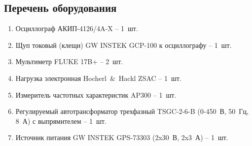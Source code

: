 \subsection{Перечень оборудования}

\begin{enumerate}
    \item Осциллограф АКИП-4126/4A-X -- 1~шт.
    \item Щуп токовый (клещи) GW INSTEK GCP-100 к осциллографу -- 1~шт.
    \item Мультиметр FLUKE 17B+ -- 2~шт.
    \item Нагрузка электронная Hocherl~\&~Hackl ZSAC -- 1~шт.
    \item Измеритель частотных характеристик AP300 -- 1~шт.
    \item Регулируемый автотрансформатор трехфазный TSGC-2-6-B (0-450~В, 50~Гц, 8~А) с выпрямителем -- 1~шт.
    \item Источник питания GW INSTEK GPS-73303 (2x30~В, 2x3~А) -- 1~шт.
\end{enumerate}